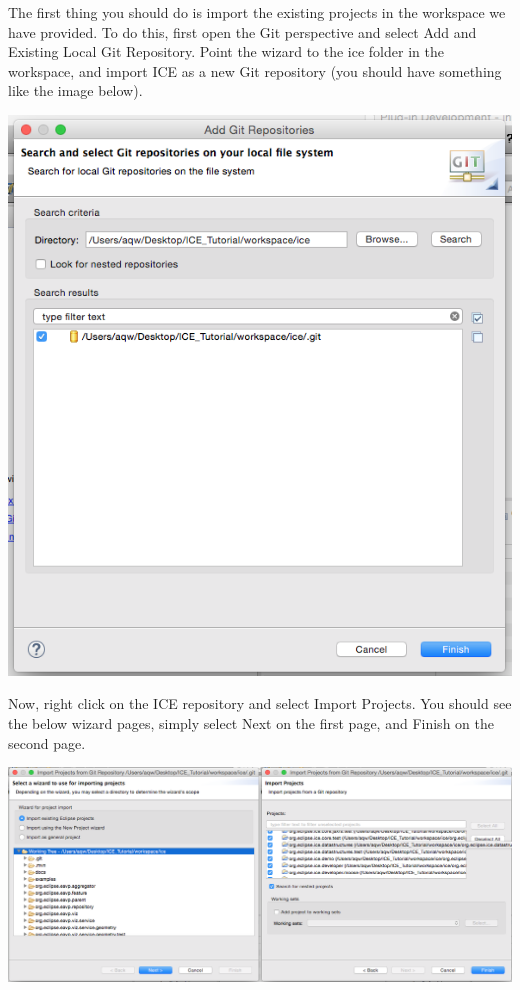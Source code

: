 \documentclass{article}
\begin{document}
The first thing you should do is import the existing projects in the workspace
we have provided. To do this, first open the Git perspective and select Add and
Existing Local Git Repository. Point the wizard to the ice folder in the
workspace, and import ICE as a new Git repository (you should have something
like the image below).
\begin{center} \includegraphics[width=\textwidth]{figures/clone} \end{center}
Now, right click on the ICE repository and select Import Projects. You should
see the below wizard pages, simply select Next on the first page, and Finish on
the second page.
\begin{center} \includegraphics[width=\textwidth]{figures/importProjects}
\end{center}
\end{document}
